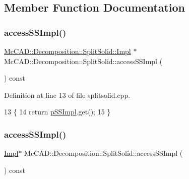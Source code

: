 \subsection{Member Function Documentation}
\mbox{\label{classMcCAD_1_1Decomposition_1_1SplitSolid_a248b079e872fe66457b2f651c278cbd0}} 
\subsubsection{\texorpdfstring{access\+S\+S\+Impl()}{accessSSImpl()}\hspace{0.1cm}{\footnotesize\ttfamily [1/2]}}
{\footnotesize\ttfamily \hyperlink{classMcCAD_1_1Decomposition_1_1SplitSolid_1_1Impl}{Mc\+C\+A\+D\+::\+Decomposition\+::\+Split\+Solid\+::\+Impl} $\ast$ Mc\+C\+A\+D\+::\+Decomposition\+::\+Split\+Solid\+::access\+S\+S\+Impl (\begin{DoxyParamCaption}{ }\end{DoxyParamCaption}) const}



Definition at line 13 of file splitsolid.\+cpp.


\begin{DoxyCode}
13                                                 \{
14   \textcolor{keywordflow}{return} \hyperlink{classMcCAD_1_1Decomposition_1_1SplitSolid_a9ae605a91ed830bea7ad866d758743ab}{pSSImpl}.get();
15 \}
\end{DoxyCode}
\mbox{\label{classMcCAD_1_1Decomposition_1_1SplitSolid_a0fd0ec2ab42d1c18e2acf78c2526293e}} 
\subsubsection{\texorpdfstring{access\+S\+S\+Impl()}{accessSSImpl()}\hspace{0.1cm}{\footnotesize\ttfamily [2/2]}}
{\footnotesize\ttfamily \hyperlink{classMcCAD_1_1Decomposition_1_1SplitSolid_1_1Impl}{Impl}$\ast$ Mc\+C\+A\+D\+::\+Decomposition\+::\+Split\+Solid\+::access\+S\+S\+Impl (\begin{DoxyParamCaption}{ }\end{DoxyParamCaption}) const}



